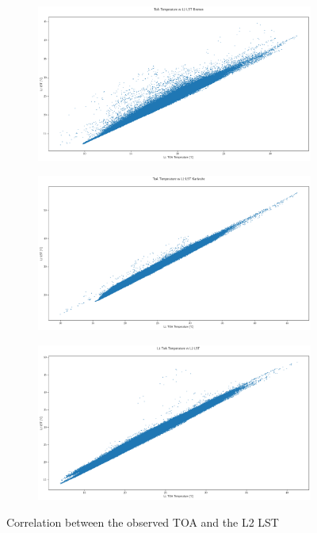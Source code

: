 \documentclass[a4paper, english]{article}
\begin{document}
\begin{figure}[!htbp]
 \centering
    \begin{subfigure}{0.32\textwidth}
    \includegraphics[width=\textwidth]{img/L1L2Bremen.png} 
    \end{subfigure}
    \begin{subfigure}{0.32\textwidth}
    \includegraphics[width=\textwidth]{img/L1L2Karlsruhe.png} 
    \end{subfigure}
    \begin{subfigure}{0.32\textwidth}
    \includegraphics[width=\textwidth]{img/L1L2Speyer.png} 
    \end{subfigure}
    \caption{Correlation between the observed TOA and the L2 LST\label{fig:l1l2comp}} 
\end{figure}
\end{document}
